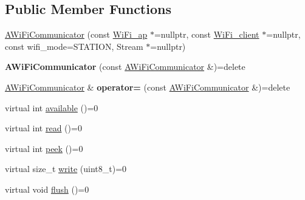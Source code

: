 \subsection*{Public Member Functions}
\begin{DoxyCompactItemize}
\item 
\mbox{\hyperlink{classathome_1_1communication_1_1wifi_1_1_a_wi_fi_communicator_a0098148fe8d0eeee99b7f8f72a72a900}{A\+Wi\+Fi\+Communicator}} (const \mbox{\hyperlink{structathome_1_1communication_1_1wifi_1_1s__wifi__access__point}{Wi\+Fi\+\_\+ap}} $\ast$=nullptr, const \mbox{\hyperlink{structathome_1_1communication_1_1wifi_1_1s__wifi__client}{Wi\+Fi\+\_\+client}} $\ast$=nullptr, const wifi\+\_\+mode=S\+T\+A\+T\+I\+ON, Stream $\ast$=nullptr)
\item 
\mbox{\label{classathome_1_1communication_1_1wifi_1_1_a_wi_fi_communicator_a5d9a73879f80042bf3c0da09ff32f0b5}} 
{\bfseries A\+Wi\+Fi\+Communicator} (const \mbox{\hyperlink{classathome_1_1communication_1_1wifi_1_1_a_wi_fi_communicator}{A\+Wi\+Fi\+Communicator}} \&)=delete
\item 
\mbox{\label{classathome_1_1communication_1_1wifi_1_1_a_wi_fi_communicator_afc2748d9230575335d3cfd7936ff26ee}} 
\mbox{\hyperlink{classathome_1_1communication_1_1wifi_1_1_a_wi_fi_communicator}{A\+Wi\+Fi\+Communicator}} \& {\bfseries operator=} (const \mbox{\hyperlink{classathome_1_1communication_1_1wifi_1_1_a_wi_fi_communicator}{A\+Wi\+Fi\+Communicator}} \&)=delete
\item 
virtual int \mbox{\hyperlink{classathome_1_1communication_1_1wifi_1_1_a_wi_fi_communicator_ab71f3c62a890abdefe549d69b40b12ba}{available}} ()=0
\item 
virtual int \mbox{\hyperlink{classathome_1_1communication_1_1wifi_1_1_a_wi_fi_communicator_ac18a51bba1651031d4ea2ac2d2a19606}{read}} ()=0
\item 
virtual int \mbox{\hyperlink{classathome_1_1communication_1_1wifi_1_1_a_wi_fi_communicator_ad5c39b1ea49f77026371c8e8ff2dba63}{peek}} ()=0
\item 
virtual size\+\_\+t \mbox{\hyperlink{classathome_1_1communication_1_1wifi_1_1_a_wi_fi_communicator_a7544a06e5b6d65108cb2c0c5702c5f29}{write}} (uint8\+\_\+t)=0
\item 
virtual void \mbox{\hyperlink{classathome_1_1communication_1_1wifi_1_1_a_wi_fi_communicator_aa974255c8bdbae19d3d4bd0f1a50318f}{flush}} ()=0

\end{DoxyCompactItemize}

